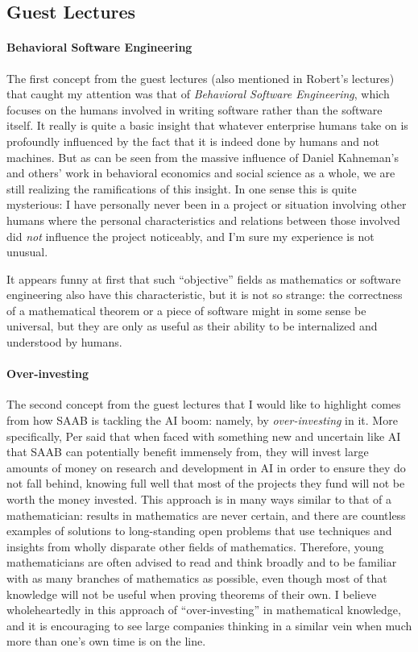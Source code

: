 \subsection*{Guest Lectures}
\paragraph{Behavioral Software Engineering} 
The first concept from the guest lectures (also mentioned in Robert's lectures) that caught my attention was that of \emph{Behavioral Software Engineering}, which focuses on the humans involved in writing software rather than the software itself. It really is quite a basic insight that whatever enterprise humans take on is profoundly influenced by the fact that it is indeed done by humans and not machines. But as can be seen from the massive influence of Daniel Kahneman's and others' work in behavioral economics and social science as a whole, we are still realizing the ramifications of this insight. In one sense this is quite mysterious: I have personally never been in a project or situation involving other humans where the personal characteristics and relations between those involved did \emph{not} influence the project noticeably, and I'm sure my experience is not unusual. 

It appears funny at first that such ``objective'' fields as mathematics or software engineering also have this characteristic, but it is not so strange: the correctness of a mathematical theorem or a piece of software might in some sense be universal, but they are only as useful as their ability to be internalized and understood by humans. 


\paragraph{Over-investing} 
The second concept from the guest lectures that I would like to highlight comes from how SAAB is tackling the AI boom: namely, by \emph{over-investing} in it. More specifically, Per said that when faced with something new and uncertain like AI that SAAB can potentially benefit immensely from, they will invest large amounts of money on research and development in AI in order to ensure they do not fall behind, knowing full well that most of the projects they fund will not be worth the money invested. This approach is in many ways similar to that of a mathematician: results in mathematics are never certain, and there are countless examples of solutions to long-standing open problems that use techniques and insights from wholly disparate other fields of mathematics. Therefore, young mathematicians are often advised to read and think broadly and to be familiar with as many branches of mathematics as possible, even though most of that knowledge will not be useful when proving theorems of their own. I believe wholeheartedly in this approach of ``over-investing'' in mathematical knowledge, and it is encouraging to see large companies thinking in a similar vein when much more than one's own time is on the line. 
